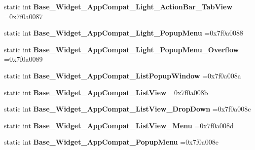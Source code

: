 \begin{DoxyCompactItemize}
static int {\bfseries Base\+\_\+\+Widget\+\_\+\+App\+Compat\+\_\+\+Light\+\_\+\+Action\+Bar\+\_\+\+Tab\+View} =0x7f0a0087
\item 
\mbox{\label{classandroid_1_1support_1_1v4_1_1R_1_1style_a347654588f9ba5d0db22e7ebc824b05c}} 
static int {\bfseries Base\+\_\+\+Widget\+\_\+\+App\+Compat\+\_\+\+Light\+\_\+\+Popup\+Menu} =0x7f0a0088
\item 
\mbox{\label{classandroid_1_1support_1_1v4_1_1R_1_1style_a19f753b685452f2d7663a617da06ac50}} 
static int {\bfseries Base\+\_\+\+Widget\+\_\+\+App\+Compat\+\_\+\+Light\+\_\+\+Popup\+Menu\+\_\+\+Overflow} =0x7f0a0089
\item 
\mbox{\label{classandroid_1_1support_1_1v4_1_1R_1_1style_aa0137b858180c0754cb16908472fa012}} 
static int {\bfseries Base\+\_\+\+Widget\+\_\+\+App\+Compat\+\_\+\+List\+Popup\+Window} =0x7f0a008a
\item 
\mbox{\label{classandroid_1_1support_1_1v4_1_1R_1_1style_a100ac6aae2e4976aa8cdd67b8aad76d0}} 
static int {\bfseries Base\+\_\+\+Widget\+\_\+\+App\+Compat\+\_\+\+List\+View} =0x7f0a008b
\item 
\mbox{\label{classandroid_1_1support_1_1v4_1_1R_1_1style_afc4090d67280f3ecee6764c6fa1aa320}} 
static int {\bfseries Base\+\_\+\+Widget\+\_\+\+App\+Compat\+\_\+\+List\+View\+\_\+\+Drop\+Down} =0x7f0a008c
\item 
\mbox{\label{classandroid_1_1support_1_1v4_1_1R_1_1style_ae0541bb736da12b73587bc65d989f30a}} 
static int {\bfseries Base\+\_\+\+Widget\+\_\+\+App\+Compat\+\_\+\+List\+View\+\_\+\+Menu} =0x7f0a008d
\item 
\mbox{\label{classandroid_1_1support_1_1v4_1_1R_1_1style_a0787eeb5833455da6d5b55111e5ed6a4}} 
static int {\bfseries Base\+\_\+\+Widget\+\_\+\+App\+Compat\+\_\+\+Popup\+Menu} =0x7f0a008e
\item 
\mbox{\label{classandroid_1_1support_1_1v4_1_1R_1_1style_a9059a78ee4ed3efe9659d7ea560d863c}} 

\end{DoxyCompactItemize}
